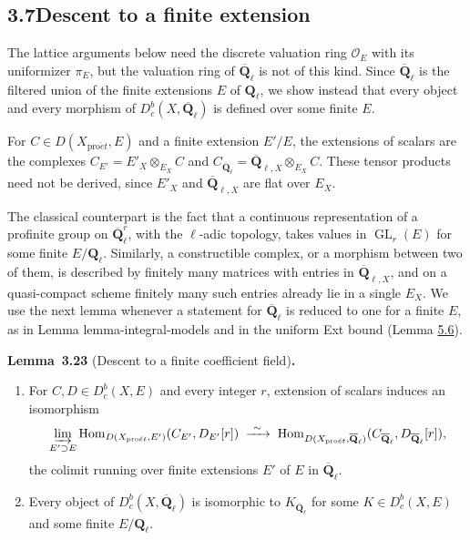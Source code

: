 \documentclass[11pt]{article}
\newenvironment{bpstatement}[2]{\par\addvspace{0.6\baselineskip}\noindent\textbf{#1}#2\textbf{.}\enspace\ignorespaces}
  {\par\addvspace{0.4\baselineskip}}
\newenvironment{bpstatementit}[2]{\begin{bpstatement}{#1}{#2}\itshape\ignorespaces}{\end{bpstatement}}
\providecommand{\Dbc}{}\renewcommand{\Dbc}{D^b_c}
\providecommand{\GL}{}\renewcommand{\GL}{\operatorname{GL}}
\providecommand{\Hom}{}\renewcommand{\Hom}{\operatorname{Hom}}
\providecommand{\QbarX}{}\renewcommand{\QbarX}{\overline{\mathbf Q}_{\ell,X}}
\begin{document}
\subsection*{\texorpdfstring{3.7\quad Descent to a finite extension}{3.7 Descent to a finite extension}}
\label{bp263}%
\label{bp264}%
The lattice arguments below need the discrete valuation ring \(\mathcal O_E\) with its uniformizer \(\pi_E\), but the valuation ring of \(\overline{\mathbf Q}_\ell\) is not of this kind. Since \(\overline{\mathbf Q}_\ell\) is the filtered union of the finite extensions \(E\) of \(\mathbf Q_\ell\), we show instead that every object and every morphism of \(\Dbc(X,\overline{\mathbf Q}_\ell)\) is defined over some finite \(E\).

For \(C\in D(X_{\mathrm{pro}\acute{e}t},E)\) and a finite extension \(E'/E\), the extensions of scalars are the complexes \(C_{E'}=E'_X\otimes_{E_X}C\) and \(C_{\overline{\mathbf Q}_\ell}=\QbarX\otimes_{E_X}C\). These tensor products need not be derived, since \(E'_X\) and \(\QbarX\) are flat over \(E_X\).

The classical counterpart is the fact that a continuous representation of a profinite group on \(\overline{\mathbf Q}_\ell^r\), with the \(\ell\)-adic topology, takes values in \(\GL_r(E)\) for some finite \(E/\mathbf Q_\ell\). Similarly, a constructible complex, or a morphism between two of them, is described by finitely many matrices with entries in \(\QbarX\), and on a quasi-compact scheme finitely many such entries already lie in a single \(E_X\). We use the next lemma whenever a statement for \(\overline{\mathbf Q}_\ell\) is reduced to one for a finite \(E\), as in Lemma lemma-integral-models and in the uniform Ext bound (Lemma \hyperref[bp426]{5.6}).

\label{bp265}%
\begin{bpstatementit}{Lemma~3.23}{ (Descent to a finite coefficient field)}
\begin{enumerate}
\item For \(C,D\in\Dbc(X,E)\) and every integer \(r\), extension of scalars induces an isomorphism \[
   \varinjlim_{E'\supset E}
   \Hom_{D(X_{\mathrm{pro}\acute{e}t},E')}(C_{E'},D_{E'}[r])
   \;\xrightarrow{\ \sim\ }\;
   \Hom_{D(X_{\mathrm{pro}\acute{e}t},\overline{\mathbf Q}_\ell)}(C_{\overline{\mathbf Q}_\ell},D_{\overline{\mathbf Q}_\ell}[r]),
   \] the colimit running over finite extensions \(E'\) of \(E\) in \(\overline{\mathbf Q}_\ell\).
\item Every object of \(\Dbc(X,\overline{\mathbf Q}_\ell)\) is isomorphic to \(K_{\overline{\mathbf Q}_\ell}\) for some \(K\in\Dbc(X,E)\) and some finite \(E/\mathbf Q_\ell\).
\end{enumerate}
\end{bpstatementit}
\end{document}
